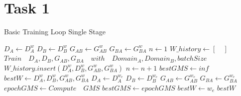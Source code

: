 \documentclass[twoside,english,notitlepage]{report}
\begin{document}
\section{Task 1}\label{task1:appendix}

\begin{algorithm}[h]
    \caption{Basic Training Loop Single Stage}\label{alg:cap}
    \begin{algorithmic}
     
        \State $D_{A} \gets D^w_{A}$
        \State $D_{B} \gets D^w_{B}$
        \State $G_{AB} \gets G^w_{AB}$
        \State $G_{BA} \gets G^w_{BA}$
        \State $n \gets 1$
        \State $W\_history \gets [\quad]$
            \State$Train \quad D_{A}, D_{B}, G_{AB}, G_{BA} \quad with \quad Domain_A, Domain_B, batchSize$
                \State $W\_history.insert({D^w_{A}, D^w_{B}, G^w_{AB}, G^w_{BA}})$
            \EndIf
            \State $n \gets n + 1$
        \EndWhile
        \State $bestGMS \gets inf$
        \State $bestW \gets {D^w_{A}, D^w_{B}, G^w_{AB}, G^w_{BA}}$
         
            \State $D_{A} \gets D^{w_{e}}_{A}$
            \State $D_{B} \gets D^{w_{e}}_{B}$
            \State $G_{AB} \gets G^{w_{e}}_{AB}$
            \State $G_{BA} \gets G^{w_{e}}_{BA}$
            \State $epochGMS \gets Compute \quad GMS$
                \State $bestGMS \gets epochGMS$
                \State $bestW \gets w_{e}$
            \EndIf
        \EndFor
        \State \Return $bestW$ 
    \EndProcedure
    \end{algorithmic}
\end{algorithm}
\end{document}
